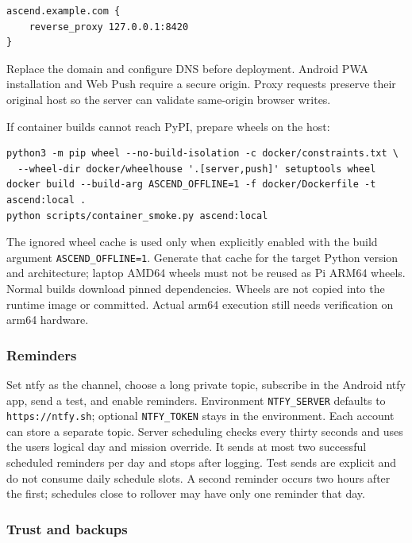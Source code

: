 \begin{verbatim}
ascend.example.com {
    reverse_proxy 127.0.0.1:8420
}
\end{verbatim}

Replace the domain and configure DNS before deployment. Android PWA
installation and Web Push require a secure origin. Proxy requests
preserve their original host so the server can validate same-origin
browser writes.

If container builds cannot reach PyPI, prepare wheels on the host:

\begin{verbatim}
python3 -m pip wheel --no-build-isolation -c docker/constraints.txt \
  --wheel-dir docker/wheelhouse '.[server,push]' setuptools wheel
docker build --build-arg ASCEND_OFFLINE=1 -f docker/Dockerfile -t ascend:local .
python scripts/container_smoke.py ascend:local
\end{verbatim}

The ignored wheel cache is used only when explicitly enabled with the build argument
\texttt{ASCEND\_OFFLINE=1}. Generate that cache for the target Python version and
architecture; laptop AMD64 wheels must not be reused as Pi ARM64 wheels. Normal
builds download pinned dependencies. Wheels are not copied into the runtime image
or committed. Actual arm64 execution still needs verification on arm64 hardware.

\hypertarget{reminders}{%
\subsubsection{Reminders}\label{reminders}}

Set ntfy as the channel, choose a long private topic, subscribe in the
Android ntfy app, send a test, and enable reminders. Environment
\texttt{NTFY\_SERVER} defaults to \texttt{https://ntfy.sh}; optional
\texttt{NTFY\_TOKEN} stays in the environment. Each account can store a
separate topic. Server scheduling checks every thirty seconds and uses
the user\textquotesingle s logical day and mission override. It sends at
most two successful scheduled reminders per day and stops after logging.
Test sends are explicit and do not consume daily schedule slots. A
second reminder occurs two hours after the first; schedules close to
rollover may have only one reminder that day.

\hypertarget{trust-and-backups}{%
\subsubsection{Trust and backups}\label{trust-and-backups}}

